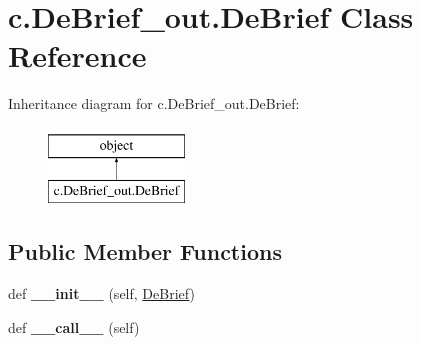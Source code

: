 \hypertarget{classc_1_1_de_brief__out_1_1_de_brief}{}\section{c.\+De\+Brief\+\_\+out.\+De\+Brief Class Reference}
\label{classc_1_1_de_brief__out_1_1_de_brief}
Inheritance diagram for c.\+De\+Brief\+\_\+out.\+De\+Brief\+:\begin{figure}[H]
\begin{center}
\leavevmode
\includegraphics[height=2.000000cm]{classc_1_1_de_brief__out_1_1_de_brief}
\end{center}
\end{figure}
\subsection*{Public Member Functions}
\begin{DoxyCompactItemize}
\item 
\hypertarget{classc_1_1_de_brief__out_1_1_de_brief_a585f4773c725a6b4de618cca97da51a5}{}def {\bfseries \+\_\+\+\_\+init\+\_\+\+\_\+} (self, \hyperlink{classc_1_1_de_brief__out_1_1_de_brief}{De\+Brief})\label{classc_1_1_de_brief__out_1_1_de_brief_a585f4773c725a6b4de618cca97da51a5}

\item 
\hypertarget{classc_1_1_de_brief__out_1_1_de_brief_af7e0a40efdc12421eb8e64f80d26f8a7}{}def {\bfseries \+\_\+\+\_\+call\+\_\+\+\_\+} (self)\label{classc_1_1_de_brief__out_1_1_de_brief_af7e0a40efdc12421eb8e64f80d26f8a7}

\end{DoxyCompactItemize}
